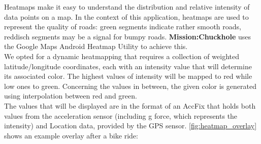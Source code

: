 \documentclass[10pt,a4paper]{article} %
\begin{document}
	Heatmaps make it easy to understand the distribution and relative intensity of data points on a map.
	In the context of this application, heatmaps are used to represent the quality of roads: green segments indicate rather smooth roads, reddisch segments may be a signal for bumpy roads.
	\textbf{Mission:Chuckhole} uses the Google Maps Android Heatmap Utility to achieve this.\\
    	We opted for a dynamic heatmapping that requires a collection of weighted latitude/longitude coordinates, each with an intensity value that will determine its associated color.
    	The highest values of intensity will be mapped to red while low ones to green. Concerning the values in between, the given color is generated using interpolation between red and green. \\
    	The values that will be displayed are in the format of an AccFix that holds both values from the acceleration sensor (including g force, which represents the intensity) and Location data, provided by the GPS sensor.
	\autoref{fig:heatmap_overlay} shows an example overlay after a bike ride:
     
\end{document}
